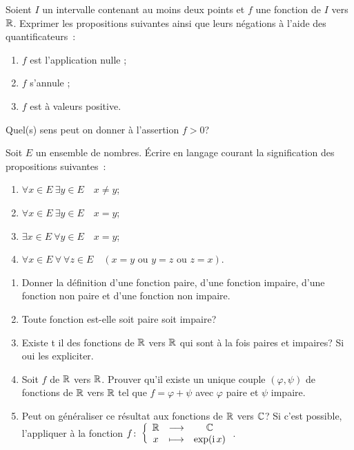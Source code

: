 \begin{exercice}
    Soient \(I\) un intervalle contenant au moins deux points et \(f\) une fonction de \(I\) vers \(\mathbb{R}\). Exprimer les
    propositions suivantes ainsi que leurs négations à l'aide des quantificateurs~:
    \begin{enumerate}
        \item \(f\) est l'application nulle ;
        \item \(f\) s'annule ;
        \item \(f\) est à valeurs positive.
    \end{enumerate}
    Quel(s) sens peut on donner à l'assertion \(f>0\)?
\end{exercice}
\begin{exercice}
    Soit \(E\) un ensemble de nombres. Écrire en langage courant la signification des propositions suivantes~:
    \begin{enumerate}
        \item \(\forall x \in E \ \exists y \in E \quad x \neq y\);
        \item \(\forall x \in E \ \exists y \in E \quad x = y\);
        \item \(\exists x \in E \ \forall y \in E \quad x = y\);
        \item \(\forall x \in E \ \forall \ \forall z \in E \quad (x=y \textrm{~ou~}
            y=z \textrm{~ou~} z=x)\).
    \end{enumerate}
\end{exercice}
\begin{exercice}
    \begin{enumerate}
        \item Donner la définition d'une fonction paire, d'une fonction impaire,
            d'une fonction non paire et d'une fonction non impaire.
        \item Toute fonction est-elle soit paire soit impaire?
        \item Existe t il des fonctions de \(\mathbb{R}\) vers \(\mathbb{R}\) qui sont à la fois
            paires  et impaires? Si oui les expliciter.
        \item Soit \(f\) de \(\mathbb{R}\) vers \(\mathbb{R}\). Prouver qu'il existe un unique
            couple \((\varphi, \psi)\) de fonctions de \(\mathbb{R}\) vers \(\mathbb{R}\) tel que
            \(f=\varphi+\psi\) avec \(\varphi\) paire et \(\psi\) impaire.
        \item Peut on généraliser ce résultat aux fonctions de \(\mathbb{R}\) vers \(\mathbb{C}\)?
            Si c'est possible, l'appliquer à la fonction
            \(f\colon \left\{\begin{array}{ccc} \mathbb{R} & \longrightarrow &\mathbb{C}\\ x & \longmapsto & \exp(\operatorname{i} x) \end{array} \right.\).
    \end{enumerate}
\end{exercice}
